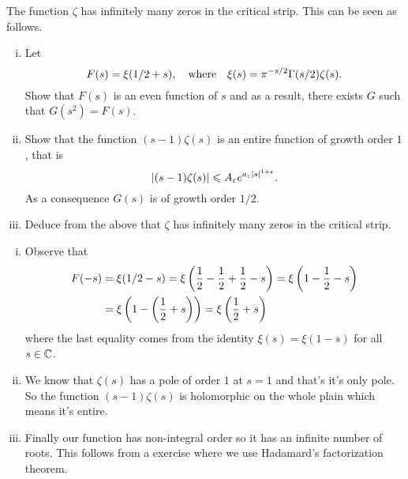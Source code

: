 \documentclass[12pt]{memoir}
\begin{document}
\begin{Ej}
    The function $\zeta$ has infinitely many zeros in the critical strip. This can be seen as follows.
    \begin{enumerate}[i)]
        \item Let 
        $$F(s)=\xi(1/2+s),\quad\text{where}\quad\xi(s)=\pi^{-s/2}\Gamma(s/2)\zeta(s).$$
        Show that $F(s)$ is an even function of $s$ and as a result, there exists $G$ such that $G(s^2)=F(s)$.
        \item Show that the function $(s-1)\zeta(s)$ is an entire function of growth order $1$, that is 
        $$|(s-1)\zeta(s)|\leqslant A_\varepsilon e^{a_\varepsilon|s|^{1+\varepsilon}}.$$
        As a consequence $G(s)$ is of growth order $1/2$.
        \item Deduce from the above that $\zeta$ has infinitely many zeros in the critical strip.
    \end{enumerate}
\end{Ej}

\begin{ptcbr}
    \begin{enumerate}[i)]
        \item Observe that 
        \begin{align*}    
        F(-s)&=\xi(1/2-s)=\xi\left(\half-\half+\half-s\right)=\xi\left(1-\half-s\right)\\
        &=\xi\left(1-\left(\half+s\right)\right)=\xi\left(\half+s\right)
        \end{align*}
        where the last equality comes from the identity $\xi(s)=\xi(1-s)$ for all $s\in\mathbb{C}$.
        \item We know that $\zeta(s)$ has a pole of order $1$ at $s=1$ and that's it's only pole. So the function $(s-1)\zeta(s)$ is holomorphic on the whole plain which means it's entire. 
        \item Finally our function has non-integral order so it has an infinite number of roots. This follows from a exercise where we use Hadamard's factorization theorem.
    \end{enumerate}
\end{ptcbr}
\end{document}
